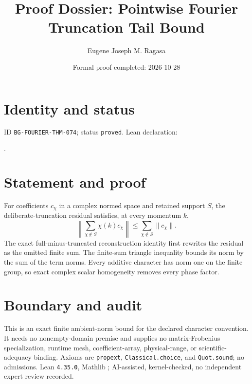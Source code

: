 \documentclass[11pt]{article}
\title{Proof Dossier: Pointwise Fourier Truncation Tail Bound}\author{Eugene Joseph M. Ragasa}\date{Formal proof completed: 2026-10-28}
\begin{document}
\raggedright\maketitle
\section{Identity and status}
ID \texttt{BG-FOURIER-THM-074}; status \texttt{proved}. Lean declaration:
\par{}.
\section{Statement and proof}
For coefficients $c_\chi$ in a complex normed space and retained support $S$, the deliberate-truncation residual satisfies, at every momentum $k$,
\[
 \left\|\sum_{\chi\notin S}\chi(k)c_\chi\right\|
 \leq \sum_{\chi\notin S}\|c_\chi\|.
\]
The exact full-minus-truncated reconstruction identity first rewrites the residual as the omitted finite sum. The finite-sum triangle inequality bounds its norm by the sum of the term norms. Every additive character has norm one on the finite group, so exact complex scalar homogeneity removes every phase factor.
\section{Boundary and audit}
This is an exact finite ambient-norm bound for the declared character convention. It needs no nonempty-domain premise and supplies no matrix-Frobenius specialization, runtime mesh, coefficient-array, physical-range, or scientific-adequacy binding. Axioms are \texttt{propext}, \texttt{Classical.choice}, and \texttt{Quot.sound}; no admissions. Lean \texttt{4.35.0}, Mathlib {\scriptsize{}}; AI-assisted, kernel-checked, no independent expert review recorded.
\end{document}
